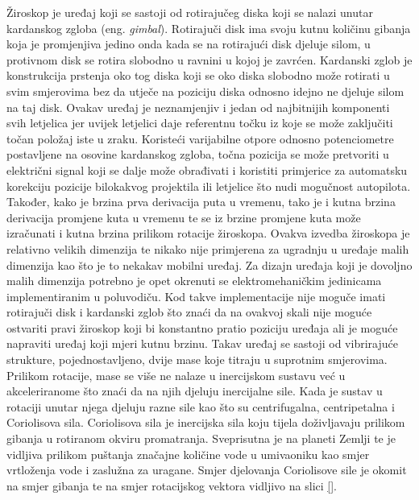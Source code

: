 \documentclass[times, utf8, diplomski]{fer}
\begin{document}
Žiroskop je uređaj koji se sastoji od rotirajučeg diska koji se nalazi unutar kardanskog zgloba (eng. \textit{gimbal}). Rotirajuči
disk ima svoju kutnu količinu gibanja koja je promjenjiva jedino onda kada se na rotirajući disk djeluje silom, u protivnom
disk se rotira slobodno u ravnini u kojoj je zavrćen. Kardanski zglob je konstrukcija prstenja oko tog diska koji se oko diska
slobodno može rotirati u svim smjerovima bez da utječe na poziciju diska odnosno idejno ne djeluje silom na taj disk. Ovakav uređaj
je neznamjenjiv i jedan od najbitnijih komponenti svih letjelica jer uvijek letjelici daje referentnu točku iz koje se može
zaključiti točan položaj iste u zraku. Koristeći varijabilne otpore odnosno potenciometre postavljene na osovine kardanskog zgloba,
točna pozicija se može pretvoriti u električni signal koji se dalje može obrađivati i koristiti primjerice za
automatsku korekciju pozicije bilokakvog projektila ili letjelice što nudi mogučnost autopilota. Također, kako je brzina prva
derivacija puta u vremenu, tako je i kutna brzina derivacija promjene kuta u vremenu te se iz brzine promjene kuta može izračunati
i kutna brzina prilikom rotacije žiroskopa. Ovakva izvedba žiroskopa je
relativno velikih dimenzija te nikako nije primjerena za ugradnju u uređaje malih dimenzija kao što je to nekakav mobilni uređaj.
Za dizajn uređaja koji je dovoljno malih dimenzija potrebno je opet okrenuti se elektromehaničkim jedinicama implementiranim u poluvodiču.
Kod takve implementacije nije moguče imati rotirajuči disk i kardanski zglob što znaći da na ovakvoj skali nije moguće ostvariti 
pravi žiroskop koji bi konstantno pratio poziciju uređaja ali je moguće napraviti uređaj koji mjeri kutnu brzinu.
Takav uređaj se sastoji od vibrirajuće strukture, pojednostavljeno, dvije mase koje titraju u suprotnim smjerovima.
Prilikom rotacije, mase se više ne nalaze u inercijskom sustavu već u akceleriranome što znaći da na njih djeluju inercijalne sile.
Kada je sustav u rotaciji unutar njega djeluju razne sile kao što su centrifugalna, centripetalna i Coriolisova sila.
Coriolisova sila je inercijska sila koju tijela doživljavaju prilikom gibanja u rotiranom okviru promatranja. Sveprisutna je na 
planeti Zemlji te je vidljiva prilikom puštanja značajne količine vode u umivaoniku kao smjer vrtloženja vode i zaslužna za
uragane. Smjer djelovanja Coriolisove sile je okomit na smjer gibanja te na smjer rotacijskog vektora vidljivo na slici \ref{}.

\end{document}
